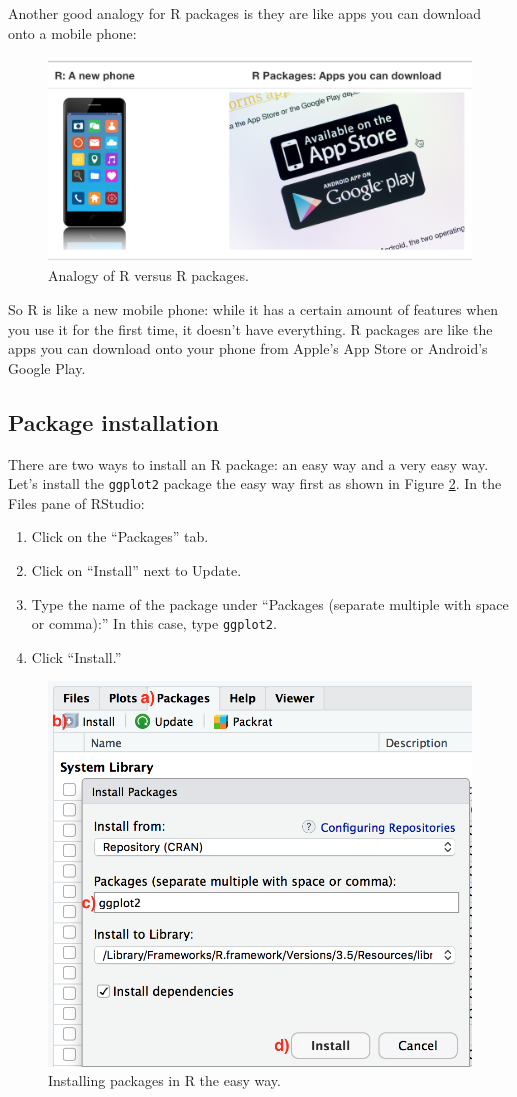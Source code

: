 \documentclass[
  12pt,
  oneside]{book}
\providecommand{\tightlist}{%
  \setlength{\itemsep}{0pt}\setlength{\parskip}{0pt}}
\theoremstyle{definition}
\theoremstyle{definition}
\theoremstyle{definition}
\theoremstyle{definition}
\theoremstyle{remark}
\begin{document}
Another good analogy for R packages  is they are like apps you can download onto a mobile phone:

\begin{figure}
\includegraphics[width=0.7\linewidth]{fig/R_vs_R_packages} \caption{Analogy of R versus R packages.}\label{fig:R-vs-R-packages}
\end{figure}

So R is like a new mobile phone: while it has a certain amount of features when you use it for the first time, it doesn't have everything. R packages are like the apps you can download onto your phone from Apple's App Store or Android's Google Play.

\hypertarget{package-installation}{%
\subsection{Package installation}\label{package-installation}}

There are two ways to install an R package: an easy way and a very easy way.  Let's install the \texttt{ggplot2} package the easy way first as shown in Figure \ref{fig:easy-way-install}. In the Files pane of RStudio:

\begin{enumerate}
\def\labelenumi{\alph{enumi})}
\tightlist
\item
  Click on the ``Packages'' tab.
\item
  Click on ``Install'' next to Update.
\item
  Type the name of the package under ``Packages (separate multiple with space or comma):'' In this case, type \texttt{ggplot2}.
\item
  Click ``Install.''
\end{enumerate}

\begin{figure}
\includegraphics[width=0.55\linewidth,height=0.55\textheight]{fig/install_packages_easy_way} \caption{Installing packages in R the easy way.}\label{fig:easy-way-install}
\end{figure}
\end{document}
